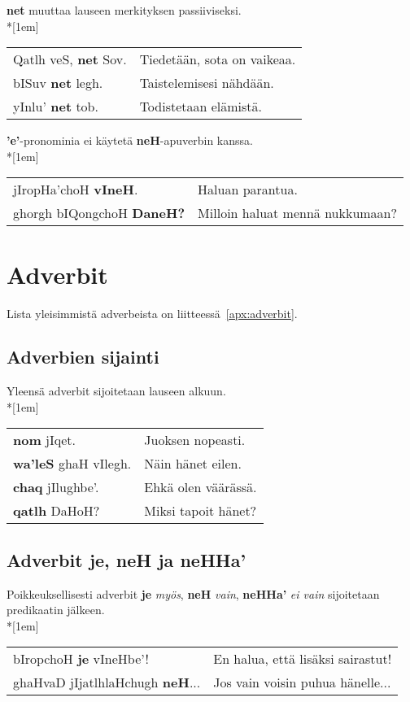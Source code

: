 \documentclass{book}
\begin{document}
\textbf{net} muuttaa lauseen merkityksen passiiviseksi.\\*[1em]
\begin{tabular}{l l}
    Qatlh veS, \textbf{net} Sov. & Tiedetään, sota on vaikeaa. \\
    bISuv \textbf{net} legh. & Taistelemisesi nähdään. \\
    yInlu' \textbf{net} tob. & Todistetaan elämistä. \\
\end{tabular}

\textbf{'e'}-pronominia ei käytetä \textbf{neH}-apuverbin kanssa.
\\*[1em]
\begin{tabular}{l l}
    jIropHa'choH \textbf{vIneH}. & Haluan parantua. \\
    ghorgh bIQongchoH \textbf{DaneH?} & Milloin haluat mennä nukkumaan? \\
\end{tabular}

\chapter{Adverbit}

Lista yleisimmistä adverbeista on liitteessä~\ref{apx:adverbit}.

\section{Adverbien sijainti}

Yleensä adverbit sijoitetaan lauseen alkuun.\\*[1em]
\begin{tabular}{l l}
    \textbf{nom} jIqet. & Juoksen nopeasti. \\
    \textbf{wa'leS} ghaH vIlegh. & Näin hänet eilen. \\
    \textbf{chaq} jIlughbe'. & Ehkä olen väärässä. \\
    \textbf{qatlh} DaHoH? & Miksi tapoit hänet? \\
\end{tabular}

\section{Adverbit je, neH ja neHHa'}

Poikkeuksellisesti adverbit \textbf{je} \textit{myös}, \textbf{neH} \textit{vain}, \textbf{neHHa'} \textit{ei vain} sijoitetaan predikaatin jälkeen.\\*[1em]
\begin{tabular}{l l}
    bIropchoH \textbf{je} vIneHbe'! & En halua, että lisäksi sairastut! \\
    ghaHvaD jIjatlhlaHchugh \textbf{neH}... & Jos vain voisin puhua hänelle... \\
\end{tabular}
\end{document}
